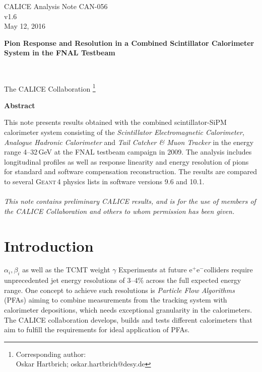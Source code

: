\documentclass[twoside,a4paper,12pt]{article}
\newcommand\eminus{\(\mathrm{e^-}\)}
\newcommand\eplus{\(\mathrm{e^+}\)}
\newcommand\geant{\textsc{Geant\,4}\xspace}
\begin{document}
\begin{titlepage}
\begin{flushright}
CALICE Analysis Note CAN-056\\
v1.6\\
May 12, 2016 \\
\end{flushright}

\begin{center}
\vspace*{\fill}
\begin{LARGE} \textbf{Pion Response and Resolution in a Combined Scintillator Calorimeter System in the FNAL Testbeam} \end{LARGE} \\ [10ex]
\begin{Large} The CALICE Collaboration \footnote{Corresponding author: \\ Oskar Hartbrich; oskar.hartbrich@desy.de}\\ [10ex] 
\end{Large}
\begin{large}
\textbf{Abstract} \\
\end{large}
\end{center}
This note presents results obtained with the combined scintillator-SiPM calorimeter system consisting of the \emph{Scintillator Electromagnetic Calorimeter}, \emph{Analogue Hadronic Calorimeter} and \emph{Tail Catcher \& Muon Tracker} in the energy range 4--32\,GeV at the FNAL testbeam campaign in 2009. The analysis includes longitudinal profiles as well as response linearity and energy resolution of pions for standard and software compensation reconstruction. The results are compared to several \geant physics lists in software versions 9.6 and 10.1.\\
\\

\textit{
This note contains preliminary CALICE results, and is for the use of members of the CALICE Collaboration and others to whom permission has been given.}

\end{titlepage}

\clearpage
\tableofcontents
\newpage
\section{Introduction}
$\alpha_i, \beta_i$ as well as the TCMT weight $\gamma$
Experiments at future \eplus\eminus colliders require unprecedented jet energy resolutions of 3--4\% across the full expected energy range. One concept to achieve such resolutions is \emph{Particle Flow Algorithms} (PFAs) aiming to combine measurements from the tracking system with calorimeter depositions, which needs exceptional granularity in the calorimeters. The CALICE collaboration develops, builds and tests different calorimeters that aim to fulfill the requirements for ideal application of PFAs.
\end{document}
